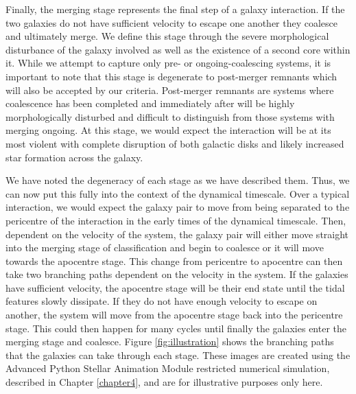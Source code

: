 Finally, the merging stage represents the final step of a galaxy interaction. If the two galaxies do not have sufficient velocity to escape one another they coalesce and ultimately merge. We define this stage through the severe morphological disturbance of the galaxy involved as well as the existence of a second core within it. While we attempt to capture only pre- or ongoing-coalescing systems, it is important to note that this stage is degenerate to post-merger remnants which will also be accepted by our criteria. Post-merger remnants are systems where coalescence has been completed and immediately after will be highly morphologically disturbed and difficult to distinguish from those systems with merging ongoing. At this stage, we would expect the interaction will be at its most violent with complete disruption of both galactic disks and likely increased star formation across the galaxy. 

We have noted the degeneracy of each stage as we have described them. Thus, we can now put this fully into the context of the dynamical timescale. Over a typical interaction, we would expect the galaxy pair to move from being separated to the pericentre of the interaction in the early times of the dynamical timescale. Then, dependent on the velocity of the system, the galaxy pair will either move straight into the merging stage of classification and begin to coalesce or it will move towards the apocentre stage. This change from pericentre to apocentre can then take two branching paths dependent on the velocity in the system. If the galaxies have sufficient velocity, the apocentre stage will be their end state until the tidal features slowly dissipate. If they do not have enough velocity to escape on another, the system will move from the apocentre stage back into the pericentre stage. This could then happen for many cycles until finally the galaxies enter the merging stage and coalesce. Figure \ref{fig:illustration} shows the branching paths that the galaxies can take through each stage. These images are created using the Advanced Python Stellar Animation Module restricted numerical simulation, described in Chapter \ref{chapter4}, and are for illustrative purposes only here.

